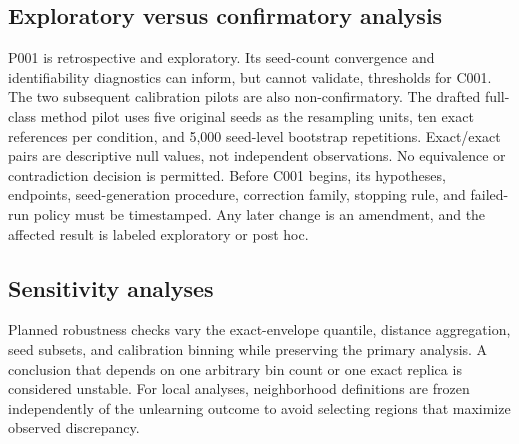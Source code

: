 \subsection{Exploratory versus confirmatory analysis}
P001 is retrospective and exploratory. Its seed-count convergence and identifiability
diagnostics can inform, but cannot validate, thresholds for C001. The two subsequent
calibration pilots are also non-confirmatory. The drafted full-class method pilot uses five
original seeds as the resampling units, ten exact references per condition, and 5,000
seed-level bootstrap repetitions. Exact/exact pairs are descriptive null values, not
independent observations. No equivalence or contradiction decision is permitted. Before
C001 begins, its hypotheses, endpoints, seed-generation procedure, correction family,
stopping rule, and failed-run policy must be timestamped. Any later change is an amendment,
and the affected result is labeled exploratory or post hoc.

\subsection{Sensitivity analyses}
Planned robustness checks vary the exact-envelope quantile, distance aggregation, seed
subsets, and calibration binning while preserving the primary analysis.  A conclusion that
depends on one arbitrary bin count or one exact replica is considered unstable.  For local
analyses, neighborhood definitions are frozen independently of the unlearning outcome to
avoid selecting regions that maximize observed discrepancy.
